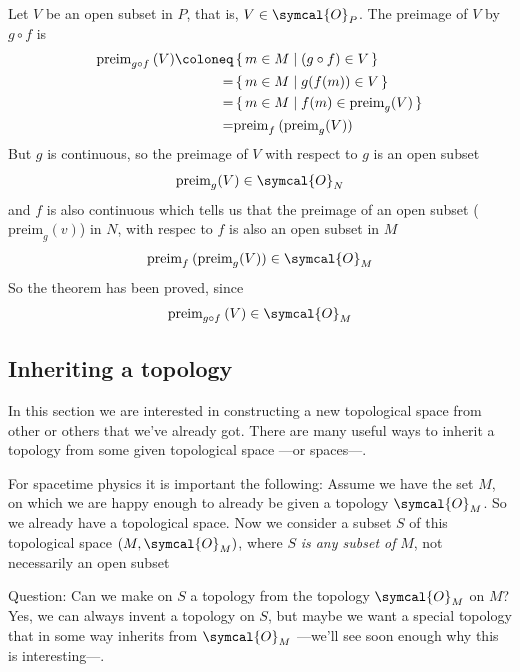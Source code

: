   Let $V$\/ be an open subset in $P$, that is, $V\in\symcal{O}_P$.
  The preimage of $V$\/ by $g\circ f$ is
  \begin{align*}
    \text{preim}_{g\circ f\/}\kern 2pt (V) \coloneq
    &\set{m\in M | (g\circ f)\in V}\\
    = &\set{m\in M | g(f(m))\in V}\\
    = &\set{m\in M | f(m)\in \text{preim}_g (V)}\\
    = &\text{preim}_f \kern 2pt(\text{preim}_g (V))
  \end{align*}
  But $g$ is continuous, so the preimage of $V$ with respect to $g$ is an open
  subset
  \[
    \text{preim}_g(V)\in\symcal{O}_N
  \]
  and $f$ is also continuous which tells us that the preimage of an open subset ($\text{preim}_g(v)$)
  in $N$, with respec to $f$ is also an open subset in $M$
  \[
    \text{preim}_f \kern 2pt(\text{preim}_g(V))\in\symcal{O}_M
  \]
  So the theorem has been proved, since
  \[
    \text{preim}_{g\circ f} \kern 2pt(V) \in\symcal{O}_M
  \]


  \subsection{Inheriting a topology}
  In this section we are interested in constructing a new topological space
  from other or others that we've already got.
  There are many useful ways to inherit a topology from some given topological
  space ---or spaces---.

  For spacetime physics it is important the following:
  Assume we have the set $M$, on which we are happy enough to already be given
  a topology $\symcal{O}_M$. So we already have a topological space.
  Now we consider a subset $S$ of this topological space
  $(M,\symcal{O}_M)$, where $S$ \emph{is any subset of} $M$, not necessarily an
  open subset
  \begin{center}
 \end{center}
 Question: Can we make on $S$ a topology from the topology $\symcal{O}_M$ on
 $M$? Yes, we can always invent a topology on $S$, but maybe we want a special
 topology that in some way inherits from $\symcal{O}_M$ ---we'll see soon
 enough why this is interesting---.

